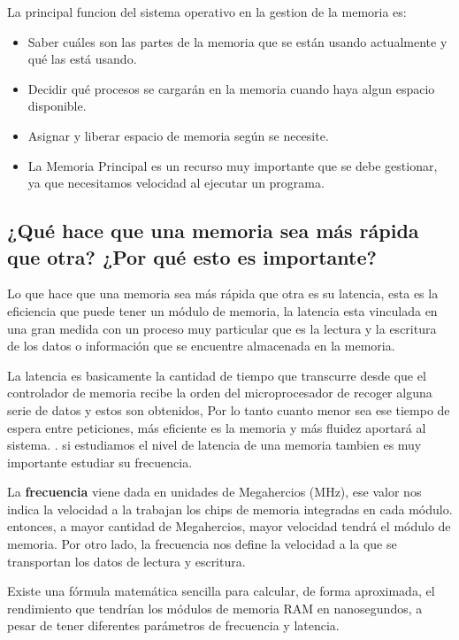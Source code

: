 \documentclass{article}
\begin{document}
\noindent
La principal funcion del sistema operativo en la gestion de la memoria es:
\begin{itemize}
\item Saber cuáles son las partes de la memoria que se están usando actualmente y qué las está usando.
\item Decidir qué procesos se cargarán en la memoria cuando haya algun espacio disponible.
\item Asignar y liberar espacio de memoria según se necesite.
\item La Memoria Principal es un recurso muy importante que se debe gestionar, ya que necesitamos velocidad al ejecutar un programa.
\cite{sites.google}

\end{itemize}

\subsection{¿Qué hace que una memoria sea más rápida que otra? ¿Por qué esto es importante?}
\noindent
Lo que hace que una memoria sea más rápida que otra es su latencia, esta es la eficiencia que puede tener un módulo de memoria, la latencia esta vinculada en una gran medida con un proceso muy particular que es la lectura y la escritura de los datos o información que se encuentre almacenada en la memoria.

\vspace{0.3cm}
\noindent
La latencia es basicamente la cantidad de tiempo que transcurre desde que el controlador de memoria recibe la orden del microprocesador de recoger alguna serie de datos y estos son obtenidos, Por lo tanto cuanto menor sea ese tiempo de espera entre peticiones, más eficiente es la memoria y más fluidez aportará al sistema. \cite{computerhoy}. 
si estudiamos el nivel de latencia de una memoria tambien es muy importante estudiar su frecuencia.

\vspace{0.3cm}
\noindent
La \textbf{frecuencia} viene dada en unidades de Megahercios (MHz), ese valor nos indica la velocidad a la trabajan los chips de memoria integradas en cada módulo. entonces, a mayor cantidad de Megahercios, mayor velocidad tendrá el módulo de memoria. Por otro lado, la frecuencia nos define la velocidad a la que se transportan los datos de lectura y escritura. 


\vspace{0.3cm}
\noindent
Existe una fórmula matemática sencilla para calcular, de forma aproximada, el rendimiento que tendrían los módulos de memoria RAM en nanosegundos, a pesar de tener diferentes parámetros de frecuencia y latencia.\cite{computerhoy}
\end{document}
